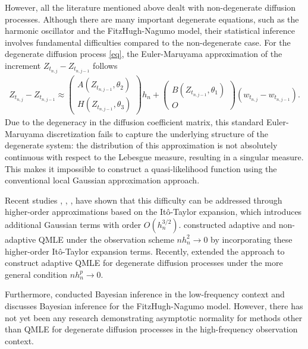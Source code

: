 \documentclass[a4paper,11pt]{jsarticle}
\begin{document}
However, all the literature mentioned above dealt with non-degenerate diffusion processes. Although there are many important degenerate equations, such as the harmonic oscillator and the FitzHugh-Nagumo model, their statistical inference involves fundamental difficulties compared to the non-degenerate case. For the degenerate diffusion process \eqref{eq}, the Euler-Maruyama approximation of the increment $Z_{t_{n,j}} - Z_{t_{n,j-1}}$ follows
\begin{align}
Z_{t_{n,j}} - Z_{t_{n,j-1}} \approx \begin{pmatrix}
  A(Z_{t_{n,j-1}},\theta_2) \\ H(Z_{t_{n,j-1}},\theta_3)
\end{pmatrix}h_n + \begin{pmatrix}
  B(Z_{t_{n,j-1}}, \theta_1)\\O
\end{pmatrix}(w_{t_{n,j}} - w_{t_{n,j-1}}).
\end{align}
Due to the degeneracy in the diffusion coefficient matrix, this standard Euler-Maruyama discretization fails to capture the underlying structure of the degenerate system: the distribution of this approximation is not absolutely continuous with respect to the Lebesgue measure, resulting in a singular measure. This makes it impossible to construct a quasi-likelihood function using the conventional local Gaussian approximation approach.

Recent studies \cite{ditlevsen2019hypoelliptic}, \cite{gloter2020adaptive,gloter2021adaptive,gloter2024non,gloter2024quasi}, \cite{iguchi2023parameter,iguchi2024parameter,iguchi2025parameter}, \cite{samson2025inference} have shown that this difficulty can be addressed through higher-order approximations based on the Itô-Taylor expansion, which introduces additional Gaussian terms with order $O(h_n^{3/2})$. \cite{gloter2020adaptive,gloter2021adaptive,gloter2024non} constructed adaptive and non-adaptive QMLE under the observation scheme $nh_n^2 \to 0$ by incorporating these higher-order Itô-Taylor expansion terms. Recently, \cite{iguchi2023parameter} extended the approach to construct adaptive QMLE for degenerate diffusion processes under the more general condition $nh_n^p \to 0$.

Furthermore, \cite{iguchi2025parameter} conducted Bayesian inference in the low-frequency context and \cite{samson2025inference} discusses Bayesian inference for the FitzHugh-Nagumo model. However, there has not yet been any research demonstrating asymptotic normality for methods other than QMLE for degenerate diffusion processes in the high-frequency observation context.
\end{document}
